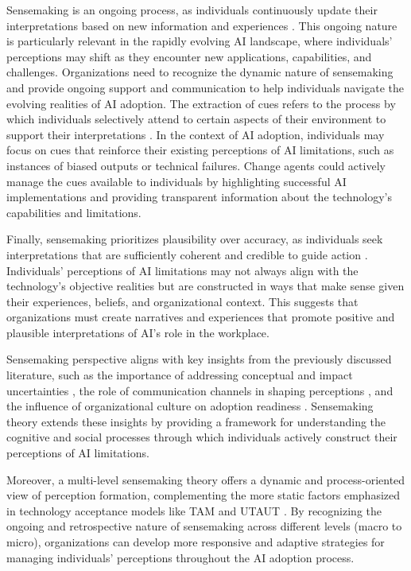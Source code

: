 Sensemaking is an ongoing process, as individuals continuously update their interpretations based on new information and experiences \citep{Weick1995}. This ongoing nature is particularly relevant in the rapidly evolving AI landscape, where individuals' perceptions may shift as they encounter new applications, capabilities, and challenges. Organizations need to recognize the dynamic nature of sensemaking and provide ongoing support and communication to help individuals navigate the evolving realities of AI adoption.
The extraction of cues refers to the process by which individuals selectively attend to certain aspects of their environment to support their interpretations \citep{Peters2022,Weick1995}. In the context of AI adoption, individuals may focus on cues that reinforce their existing perceptions of AI limitations, such as instances of biased outputs or technical failures. Change agents could actively manage the cues available to individuals by highlighting successful AI implementations and providing transparent information about the technology's capabilities and limitations.

Finally, sensemaking prioritizes plausibility over accuracy, as individuals seek interpretations that are sufficiently coherent and credible to guide action \citep{Weick1995}. Individuals' perceptions of AI limitations may not always align with the technology's objective realities but are constructed in ways that make sense given their experiences, beliefs, and organizational context. This suggests that organizations must create narratives and experiences that promote positive and plausible interpretations of AI's role in the workplace.

Sensemaking perspective aligns with key insights from the previously discussed literature, such as the importance of addressing conceptual and impact uncertainties \citep{Yin2024}, the role of communication channels in shaping perceptions \cite{Agarwal1998}, and the influence of organizational culture on adoption readiness \cite{Johnk2021}. Sensemaking theory extends these insights by providing a framework for understanding the cognitive and social processes through which individuals actively construct their perceptions of AI limitations.

Moreover, a multi-level sensemaking theory offers a dynamic and process-oriented view of perception formation, complementing the more static factors emphasized in technology acceptance models like TAM and UTAUT \citep{Davis1989,Venkatesh2003}. By recognizing the ongoing and retrospective nature of sensemaking across different levels (macro to micro), organizations can develop more responsive and adaptive strategies for managing individuals' perceptions throughout the AI adoption process.

